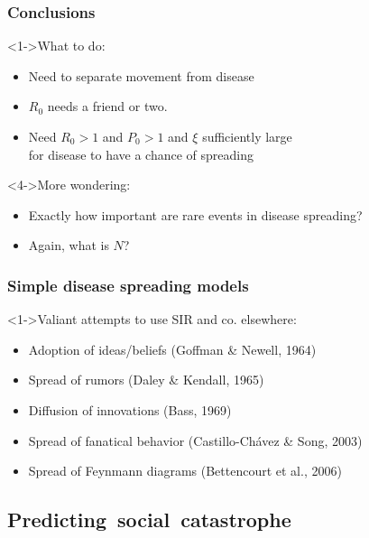 \begin{frame}
 \frametitle{Conclusions}

 \begin{block}<1->{What to do:}
   \begin{itemize}
   \item<1-> Need to separate movement from disease
   \item<2-> $R_0$ needs a friend or two.
   \item<3-> Need $R_0>1$ and $P_0>1$ and $\xi$ sufficiently large\\
     for disease to have a chance of spreading
   \end{itemize}
 \end{block}

 \begin{block}<4->{More wondering:}
   \begin{itemize}
   \item<4-> Exactly how important are rare events in disease spreading?
   \item<5-> Again, what is $N$?
   \end{itemize}
 \end{block}

\end{frame}

\begin{frame}
  \frametitle{Simple disease spreading models}

  \begin{block}<1->{Valiant attempts to use SIR and co. elsewhere:}
    \begin{itemize}
    \item<2-> Adoption of ideas/beliefs (Goffman \& Newell, 1964)\cite{goffman1964a}
    \item<3-> Spread of rumors (Daley \& Kendall, 1965)\cite{daley1965a}
    \item<4-> Diffusion of innovations (Bass, 1969)\cite{bass1969a}
    \item<5-> Spread of fanatical behavior (Castillo-Ch\'{a}vez \& Song, 2003)
    \item<6-> Spread of Feynmann diagrams (Bettencourt et al., 2006)
    \end{itemize}
  \end{block}


\end{frame}

\subsection{Predicting\ social\ catastrophe}

